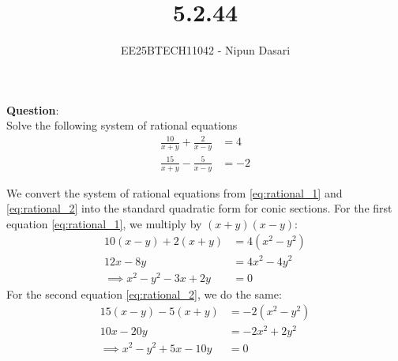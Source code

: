 \documentclass[journal]{IEEEtran}
\begin{document}
	
	
	\vspace{3cm}
	
	\title{5.2.44}
	\author{EE25BTECH11042 - Nipun Dasari}
	\maketitle
	
	\renewcommand{\thefigure}{\theenumi}
	\renewcommand{\thetable}{\theenumi}
	\setlength{\intextsep}{10pt}
	
	\renewcommand{\thetable}{\theenumi}
	
	\textbf{Question}:\\
	Solve the following system of rational equations
	\begin{align}
		\frac{10}{x+y}+\frac{2}{x-y} &= 4 \label{eq:rational_1} \\
		\frac{15}{x+y}-\frac{5}{x-y} &= -2 \label{eq:rational_2}
	\end{align}
	
	\solution
	
	We convert the system of rational equations from \eqref{eq:rational_1} and \eqref{eq:rational_2} into the standard quadratic form for conic sections.
	For the first equation \eqref{eq:rational_1}, we multiply by $(x+y)(x-y)$:
	\begin{align}
		10(x-y) + 2(x+y) &= 4(x^2 - y^2) \nonumber \\
		12x - 8y &= 4x^2 - 4y^2 \nonumber \\
		\implies x^2 - y^2 - 3x + 2y &= 0 \label{eq:H1}
	\end{align}
	For the second equation \eqref{eq:rational_2}, we do the same:
	\begin{align}
		15(x-y) - 5(x+y) &= -2(x^2 - y^2) \nonumber \\
		10x - 20y &= -2x^2 + 2y^2 \nonumber \\
		\implies x^2 - y^2 + 5x - 10y &= 0 \label{eq:H2}
	\end{align}
	
\end{document}

